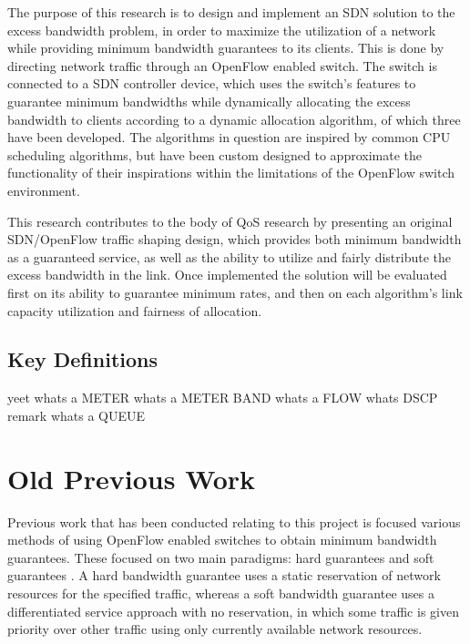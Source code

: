\documentclass[accepted,single]{gipaper}
\begin{document}
\hspace{10mm} The purpose of this research is to design and implement an SDN solution to the excess bandwidth problem, in order to maximize the utilization of a network while providing minimum bandwidth guarantees to its clients. This is done by directing network traffic through an OpenFlow enabled switch. The switch is connected to a SDN controller device, which uses the switch's features to guarantee minimum bandwidths while dynamically allocating the excess bandwidth to clients according to a dynamic allocation algorithm, of which three have been developed. The algorithms in question are inspired by common CPU scheduling algorithms, but have been custom designed to approximate the functionality of their inspirations within the limitations of the OpenFlow switch environment.

\hspace{10mm} This research contributes to the body of QoS research by presenting an original SDN/OpenFlow traffic shaping design, which provides both minimum bandwidth as a guaranteed service, as well as the ability to utilize and fairly distribute the excess bandwidth in the link. Once implemented the solution will be evaluated first on its ability to guarantee minimum rates, and then on each algorithm's link capacity utilization and fairness of allocation.


\subsection{Key Definitions}
\label{definitions}

yeet whats a METER whats a METER BAND whats a FLOW whats DSCP remark whats a QUEUE

\iffalse
\section{Old Previous Work}
\label{oprev_work}

Previous work that has been conducted relating to this project is focused various methods of using OpenFlow enabled switches to obtain minimum bandwidth guarantees. These focused on two main paradigms: hard guarantees and soft guarantees \cite{softqos}. A hard bandwidth guarantee uses a static reservation of network resources for the specified traffic, whereas a soft bandwidth guarantee uses a differentiated service approach with no reservation, in which some traffic is given priority over other traffic using only currently available network resources. 
\end{document}
